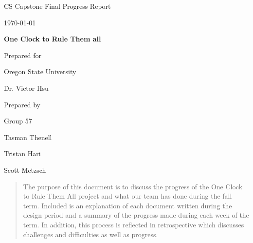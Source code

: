 \documentclass[onecolumn, draftclsnofoot,10pt, compsoc]{IEEEtran}
\def \CapstoneTeamName{		One Clock to Rule Them all}
\def \CapstoneTeamNumber{		57}
\def \GroupMemberOne{			Tasman Thenell}
\def \GroupMemberTwo{			Tristan Hari}
\def \GroupMemberThree{			Scott Metzsch}
\def \CapstoneProjectName{		One Clock to Rule Them all}
\def \CapstoneSponsorCompany{	Oregon State University}
\def \CapstoneSponsorPerson{		Dr. Victor Hsu}
\def \DocType{		%
				Final Progress Report
				}
\newcommand{\NameSigPair}[1]{\par
\makebox[2.75in][r]{#1} \hfil 	\makebox[3.25in]{\makebox[2.25in]{\hrulefill} \hfill		\makebox[.75in]{\hrulefill}}
\par\vspace{-12pt} \textit{\tiny\noindent
\makebox[2.75in]{} \hfil		\makebox[3.25in]{\makebox[2.25in][r]{Signature} \hfill	\makebox[.75in][r]{Date}}}}
\renewcommand{\NameSigPair}[1]{#1}
\begin{document}
\begin{titlepage}
    \begin{singlespace}
        \hfill
        \par\vspace{.2in}
        \centering
        \scshape{
            \huge CS Capstone \DocType \par
            {\large\today}\par
            \vspace{.5in}
            \textbf{\Huge\CapstoneProjectName}\par
            \vfill
            {\large Prepared for}\par
            \Huge \CapstoneSponsorCompany\par
            \vspace{5pt}
            {\Large\NameSigPair{\CapstoneSponsorPerson}\par}
            {\large Prepared by }\par
            Group\CapstoneTeamNumber\par
            \vspace{5pt}
            {\Large
                \NameSigPair{\GroupMemberOne}\par
                \NameSigPair{\GroupMemberTwo}\par
                \NameSigPair{\GroupMemberThree}\par
            }
            \vspace{20pt}
        }
        \begin{abstract}
        	The purpose of this document is to discuss the progress of the One Clock to Rule Them All project and what our team has done during the fall term.
Included is an explanation of each document written during the design period and a summary of the progress made during each week of the term.
In addition, this process is reflected in retrospective which discusses challenges and difficulties as well as progress.
        \end{abstract}
    \end{singlespace}
\end{titlepage}
\newpage
{}
\singlespacing
\tableofcontents
\clearpage
\onehalfspacing
\end{document}
